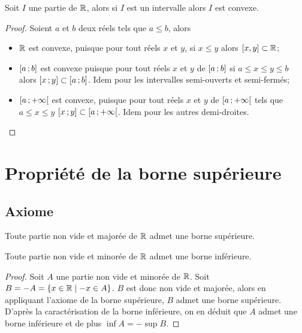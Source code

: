 \begin{theo}
  \label{theo:partieconvexe1}
  Soit \(I\) une partie de \(\mathbb{R}\), alors si \(I\) est un intervalle alors \(I\) 
  est convexe.
\end{theo}
\begin{proof}
  Soient \(a\) et \(b\) deux réels tels que \(a\leqslant b\), alors
  \begin{itemize}
    \item \(\mathbb{R}\) est convexe, puisque pour tout réels \(x\) et \(y\), si 
      \(x\leqslant y\) alors \([x,y]\subset \mathbb{R}\);
    \item \(\left[ a \, ;  b \right]\) est convexe puisque pour tout réels \(x\) et 
      \(y\) de \(\left[ a \, ;  b \right]\) si \(a\leqslant x\leqslant y\leqslant b\) 
      alors \(\left[ x \, ;  y \right]\subset \left[ a \, ;  b \right]\). Idem pour les 
      intervalles semi-ouverts et semi-fermés;
    \item \(\left[ a \, ;  +\infty \right[\) est convexe, puisque pour tout réels 
      \(x\) et \(y\) de \(\left[ a \, ;  +\infty \right[\) tels que \(a\leqslant 
      x\leqslant y\) \(\left[ x \, ;  y \right]\subset \left[ a \, ;  +\infty \right[\). 
      Idem pour les autres demi-droites.
  \end{itemize}
\end{proof}

\section{Propriété de la borne supérieure}

\subsection{Axiome}

\begin{theo}
  \label{theo:bornesup}
  Toute partie non vide et majorée de \(\mathbb{R}\) admet une borne supérieure.
\end{theo}
\begin{theo}
  Toute partie non vide et minorée de \(\mathbb{R}\) admet une borne inférieure.
\end{theo}
\begin{proof}
  Soit \(A\) une partie non vide et minorée de \(\mathbb{R}\). Soit \(B=-A=\left\{x\in 
  \mathbb{R}\mathrel{}\middle|\mathrel{}-x \in A\right\}\). \(B\) est donc non vide et majorée, alors en appliquant 
  l'axiome de la borne supérieure, \(B\) admet une borne supérieure. D'après la 
  caractérisation de la borne inférieure, on en déduit que \(A\) admet une borne 
  inférieure et de plus \(\inf A=-\sup B\).
\end{proof}

